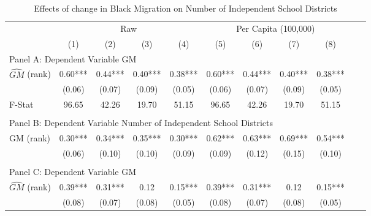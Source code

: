  \begin{table}[htbp]\centering {} \begin{threeparttable} \caption{Effects of change in Black Migration on Number of Independent School Districts} \begin{tabular}{l*{10}{c}} \toprule
                &\multicolumn{4}{c}{Raw}                                    &\multicolumn{4}{c}{Per Capita (100,000)}                   \\\cmidrule(lr){2-5}\cmidrule(lr){6-9}
                &\multicolumn{1}{c}{(1)}   &\multicolumn{1}{c}{(2)}   &\multicolumn{1}{c}{(3)}   &\multicolumn{1}{c}{(4)}   &\multicolumn{1}{c}{(5)}   &\multicolumn{1}{c}{(6)}   &\multicolumn{1}{c}{(7)}   &\multicolumn{1}{c}{(8)}   \\
\cmidrule(lr){1-9}
\multicolumn{8}{l}{Panel A: Dependent Variable GM}\\
\cmidrule(lr){1-9}
$\hat{GM}$ (rank)&       0.60***&       0.44***&       0.40***&       0.38***&       0.60***&       0.44***&       0.40***&       0.38***\\
                &     (0.06)   &     (0.07)   &     (0.09)   &     (0.05)   &     (0.06)   &     (0.07)   &     (0.09)   &     (0.05)   \\
\midrule
F-Stat          &      96.65   &      42.26   &      19.70   &      51.15   &      96.65   &      42.26   &      19.70   &      51.15   \\
\cmidrule[\heavyrulewidth](lr){1-9} \\ \cmidrule[\heavyrulewidth](lr){1-9}
\multicolumn{8}{l}{Panel B: Dependent Variable Number of Independent School Districts}\\
\cmidrule(lr){1-9}
GM  (rank)      &       0.30***&       0.34***&       0.35***&       0.30***&       0.62***&       0.63***&       0.69***&       0.54***\\
                &     (0.06)   &     (0.10)   &     (0.10)   &     (0.09)   &     (0.09)   &     (0.12)   &     (0.15)   &     (0.10)   \\
\cmidrule[\heavyrulewidth](lr){1-9} \\ \cmidrule[\heavyrulewidth](lr){1-9}
\multicolumn{8}{l}{Panel C: Dependent Variable GM}\\
\cmidrule(lr){1-9}
$\hat{GM}$ (rank)&       0.39***&       0.31***&       0.12   &       0.15***&       0.39***&       0.31***&       0.12   &       0.15***\\
                &     (0.08)   &     (0.07)   &     (0.08)   &     (0.05)   &     (0.08)   &     (0.07)   &     (0.08)   &     (0.05)   \\

\end{tabular}
\end{threeparttable}
\end{table}
